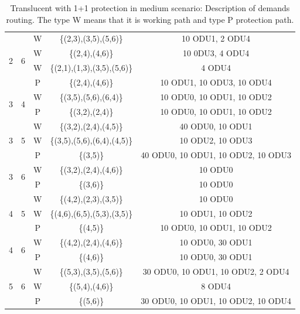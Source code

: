 \begin{table}[h]
\begin{tabular}{||c|c|c|c|c||}
 \multirow{4}{*}{2} & \multirow{4}{*}{6}&W&\{(2,3),(3,5),(5,6)\}& 10 ODU1, 2 ODU4 \\
  & &W& \{(2,4),(4,6)\} & 10 0DU3, 4 ODU4 \\
  & &W& \{(2,1),(1,3),(3,5),(5,6)\} & 4 ODU4 \\
  & &P& \{(2,4),(4,6)\} & 10 ODU1, 10 ODU3, 10 ODU4 \\ \hline
 \multirow{2}{*}{3} & \multirow{2}{*}{4}&W& \{(3,5),(5,6),(6,4)\} & 10 ODU0, 10 ODU1, 10 ODU2 \\
  & &P& \{(3,2),(2,4)\} & 10 ODU0, 10 ODU1, 10 ODU2 \\ \hline
 \multirow{3}{*}{3}&\multirow{3}{*}{5}&W&\{(3,2),(2,4),(4,5)\}&40 ODU0, 10 ODU1 \\
  & &W& \{(3,5),(5,6),(6,4),(4,5)\}& 10 ODU2, 10 ODU3\\
  & &P& \{(3,5)\} & 40 ODU0, 10 ODU1, 10 ODU2, 10 ODU3 \\ \hline
 \multirow{2}{*}{3} & \multirow{2}{*}{6}&W& \{(3,2),(2,4),(4,6)\} & 10 ODU0 \\
  & &P& \{(3,6)\} & 10 ODU0 \\ \hline
 \multirow{3}{*}{4} & \multirow{3}{*}{5}&W& \{(4,2),(2,3),(3,5)\} & 10 ODU0 \\
  & &W& \{(4,6),(6,5),(5,3),(3,5)\} & 10 ODU1, 10 ODU2 \\
  & &P& \{(4,5)\} & 10 ODU0, 10 ODU1, 10 ODU2 \\ \hline
 \multirow{2}{*}{4} & \multirow{2}{*}{6}&W& \{(4,2),(2,4),(4,6)\} & 10 ODU0, 30 ODU1\\
  & &P& \{(4,6)\} & 10 ODU0, 30 ODU1\\ \hline
 \multirow{3}{*}{5} & \multirow{3}{*}{6}&W&\{(5,3),(3,5),(5,6)\}& 30 ODU0, 10 ODU1, 10 ODU2, 2 ODU4 \\
  & &W& \{(5,4),(4,6)\} & 8 ODU4 \\
  & &P& \{(5,6)\}& 30 ODU0, 10 ODU1, 10 ODU2, 10 ODU4 \\ \hline
\end{tabular}
\caption{Translucent with 1+1 protection in medium scenario: Description of demands routing. The type W means that it is working path and type P protection path.}
\label{path_transluc_protec_ref_medium}
\end{table}
\newpage
